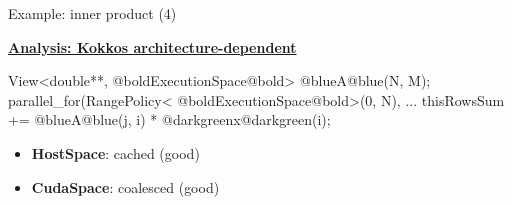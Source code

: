 \begin{frame}[fragile]{Example: inner product (4)}

  \ul{\textbf{Analysis: Kokkos architecture-dependent}}

  \vspace{-3pt}

  \begin{code}[keywords={}]
View<double**, @boldExecutionSpace@bold> @blueA@blue(N, M);
parallel_for(RangePolicy< @boldExecutionSpace@bold>(0, N),
  ... thisRowsSum += @blueA@blue(j, i) * @darkgreenx@darkgreen(i);
  \end{code}

  \vspace{-20pt}

  \begin{figure}
    \centering
     \qquad
  \end{figure}

  \vspace{-10pt}

  \begin{itemize}
    \item{\textbf{HostSpace}: cached ({\color{darkgreen}good})}
    \item{\textbf{CudaSpace}: coalesced ({\color{darkgreen}good})}
  \end{itemize}

\end{frame}
\setcounter{subfigure}{0}%


